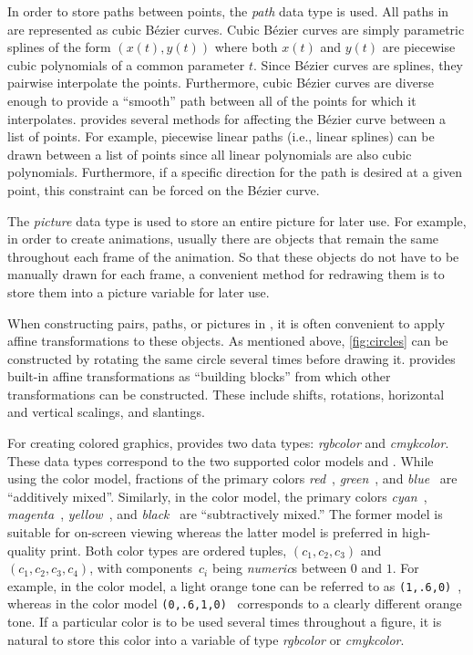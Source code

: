 In order to store paths between points, the \textit{path} data type is
used.  All paths in \MP{} are represented as cubic B\'{e}zier curves.
Cubic B\'{e}zier curves are simply parametric splines of the form
$(x(t),y(t))$ where both $x(t)$ and $y(t)$ are piecewise cubic
polynomials of a common parameter $t$.  Since B\'{e}zier curves are
splines, they pairwise interpolate the points.  Furthermore, cubic
B\'{e}zier curves are diverse enough to provide a ``smooth'' path
between all of the points for which it interpolates.  \MP{} provides
several methods for affecting the B\'{e}zier curve between a list of
points.  For example, piecewise linear paths (i.e., linear splines) can
be drawn between a list of points since all linear polynomials are also
cubic polynomials.  Furthermore, if a specific direction for the path is
desired at a given point, this constraint can be forced on the
B\'{e}zier curve.

The \textit{picture} data type is used to store an entire picture for
later use.  For example, in order to create animations, usually there
are objects that remain the same throughout each frame of the animation.
So that these objects do not have to be manually drawn for each frame, a
convenient method for redrawing them is to store them into a picture
variable for later use.

When constructing pairs, paths, or pictures in \MP{}, it is often
convenient to apply affine transformations to these objects.  As
mentioned above, \autoref{fig:circles} can be constructed by rotating
the same circle several times before drawing it.  \MP{} provides
built-in affine transformations as ``building blocks'' from which other
transformations can be constructed.  These include shifts, rotations,
horizontal and vertical scalings, and slantings.

For creating colored graphics, \MP{} provides two data types:
\textit{rgbcolor} and \textit{cmykcolor}.  These data types correspond
to the two supported color models \RGB{} and \CMYK.  While using the
\RGB{} color model, fractions of the primary colors
\textit{red}~, \textit{green}~, and
\textit{blue}~ are ``additively mixed''.  Similarly, in
the \CMYK{} color model, the primary colors
\textit{cyan}~, \textit{magenta}~,
\textit{yellow}~, and \textit{black}~ are
``subtractively mixed.''  The former model is suitable for on-screen
viewing whereas the latter model is preferred in high-quality print.
Both color types are ordered tuples, $(c_1,c_2,c_3)$ and
$(c_1,c_2,c_3,c_4)$, with components~$c_i$ being \textit{numeric}s
between $0$ and $1$.  For example, in the \RGB{} color model, a light
orange tone can be referred to as
\texttt{(1,.6,0)}~, whereas in the \CMYK{} color
model \texttt{(0,.6,1,0)}~ corresponds to a
clearly different orange tone.  If a particular color is to be used
several times throughout a figure, it is natural to store this color
into a variable of type \textit{rgbcolor} or \textit{cmykcolor}.

